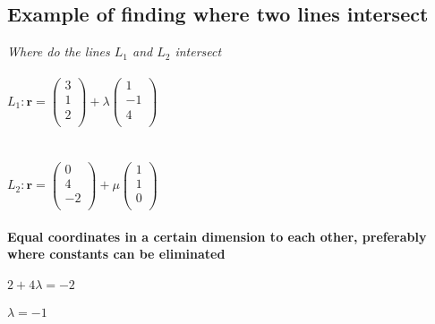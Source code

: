 \documentclass{article}[18pt]
\begin{document}
\subsection{Example of finding where two lines intersect}
\textit{Where do the lines $L_1$ and $L_2$ intersect}\\
\\
$L_1: \mathbf{r}=
\begin{pmatrix}
3\\
1\\
2\\
\end{pmatrix}+\lambda
\begin{pmatrix}
1\\
-1\\
4\\
\end{pmatrix}$\\
\\
\\
$L_2: \mathbf{r}=
\begin{pmatrix}
0\\
4\\
-2\\
\end{pmatrix}+\mu
\begin{pmatrix}
1\\
1\\
0\\
\end{pmatrix}$\\
\\
\textbf{Equal coordinates in a certain dimension to each other, preferably where constants can be eliminated}\\
\\
$2+4\lambda=-2$\\
\\
$\lambda=-1$
\end{document}
